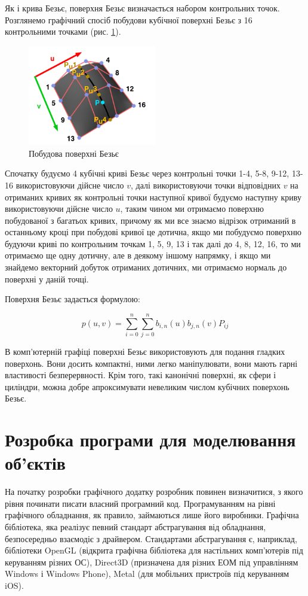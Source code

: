 \let\mypdfximage\pdfximage\def\pdfximage{\immediate\mypdfximage}\documentclass[14pt,a4paper]{extarticle}
\theoremstyle{definition}
\renewcommand{\[}{\begin{singlespace}\begin{equation*}}
\renewcommand{\]}{\end{equation*}\end{singlespace}}
\renewcommand{\+}{\discretionary{\mbox{\scriptsize$\hookleftarrow$}}{}{}}
\begin{document}
Як і крива Безьє, поверхня Безьє визначається набором контрольних точок. Розглянемо графічний спосіб побудови кубічної поверхні Безьє з 16 контрольними точками (рис. \ref{fig:bezier-surface}). 

\begin{figure}[!htb]
    \centering
    \includegraphics[width=0.5\textwidth]{bezier-surface.png}
    \caption{Побудова поверхні Безьє}\label{fig:bezier-surface}
\end{figure}

Спочатку будуємо 4 кубічні криві Безьє через контрольні точки 1-4, 5-8, 9-12, 13-16 використовуючи дійсне число $v$, далі використовуючи точки відповідних $v$ на отриманих кривих як контрольні точки наступної кривої будуємо наступну криву використовуючи дійсне число $u$, таким чином ми отримаємо поверхню побудованої з багатьох кривих, причому як ми все знаємо відрізок отриманий в останньому кроці при побудові кривої це дотична, якщо ми побудуємо поверхню будуючи криві по контрольним точкам 1, 5, 9, 13 і так далі до 4, 8, 12, 16, то ми отримаємо ще одну дотичну, але в деякому іншому напрямку, і якщо ми знайдемо векторний добуток отриманих дотичних, ми отримаємо нормаль до поверхні у даній точці.

Поверхня Безьє задається формулою:
\[p(u,v)=\sum_{i=0}^n\sum_{j=0}^n b_{i,n}(u) b_{j,n}(v) P_{ij}\]

В комп'ютерній графіці поверхні Безьє використовують для подання гладких поверхонь. Вони досить компактні, ними легко маніпулювати, вони мають гарні властивості безперервності. Крім того, такі канонічні поверхні, як сфери і циліндри, можна добре апроксимувати невеликим числом кубічних поверхонь Безьє.

\section{Розробка програми для моделювання об'єктів}

На початку розробки графічного додатку розробник повинен визначитися, з якого рівня починати писати власний програмний код. Програмуванням на рівні графічного обладнання, як правило, займаються лише його виробники. Графічна бібліотека, яка реалізує певний стандарт абстрагування від обладнання, безпосередньо взаємодіє з драйвером. Стандартами абстрагування є, наприклад, бібліотеки OpenGL (відкрита графічна бібліотека для настільних комп'ютерів під керуванням різних ОС), Direct3D (призначена для різних ЕОМ під управлінням Windows і Windows Phone), Metal (для мобільних пристроїв під керуванням iOS). \cite{ryabin}
\end{document}
